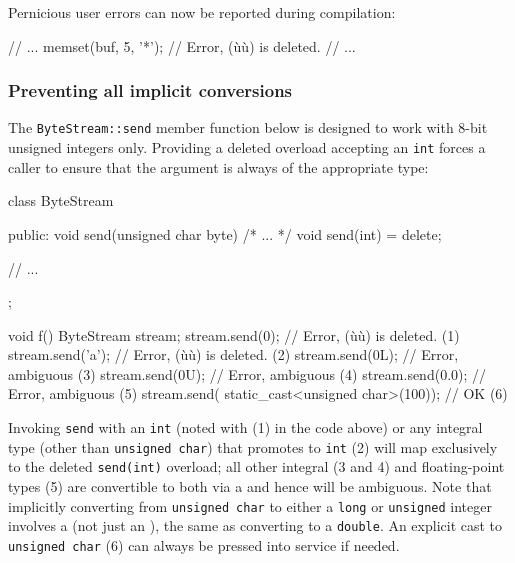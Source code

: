 \noindent Pernicious user errors can now be reported during compilation:

\begin{emcppslisting}
// ...
memset(buf, 5, '*');  // Error, (ù{}ù) is deleted.
// ...
\end{emcppslisting}


\subsubsection[Preventing all implicit conversions]{Preventing all implicit conversions}\label{preventing-all-implicit-conversions}

The \lstinline!ByteStream::send! member function below is designed to work
with 8-bit unsigned integers only. Providing a deleted overload
accepting an \lstinline!int! forces a caller to ensure that the argument is
always of the appropriate type:

\begin{emcppslisting}
class ByteStream
{
public:
    void send(unsigned char byte) { /* ... */ }
    void send(int) = delete;

    // ...
};

void f()
{
    ByteStream stream;
    stream.send(0);   // Error, (ù{}ù) is deleted.     (1)
    stream.send('a'); // Error, (ù{}ù) is deleted.     (2)
    stream.send(0L);  // Error, ambiguous                 (3)
    stream.send(0U);  // Error, ambiguous                 (4)
    stream.send(0.0); // Error, ambiguous                 (5)
    stream.send(
        static_cast<unsigned char>(100));  // OK          (6)
}
\end{emcppslisting}

\noindent Invoking \lstinline!send! with an \lstinline!int! (noted with (1) in the code above) or any integral type
(other than \lstinline!unsigned!~\lstinline!char!) that promotes to \lstinline!int! (2)
will map exclusively to the deleted \lstinline!send(int)! overload; all
other integral (3 and 4) and floating-point types (5) are convertible to
both via a  and hence will be ambiguous. Note that
implicitly converting from \lstinline!unsigned!~\lstinline!char! to either a
\lstinline!long! or \lstinline!unsigned! integer involves a  (not just an ), the same as
  converting to a \lstinline!double!.
An explicit cast to \lstinline!unsigned!~\lstinline!char! (6) can always be
pressed into service if needed.

